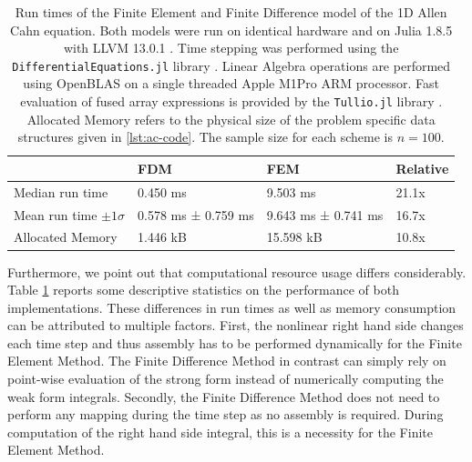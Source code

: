\documentclass[sn-mathphys,Numbered]{sn-jnl}%
\theoremstyle{thmstyleone}%
\theoremstyle{thmstyletwo}%
\theoremstyle{thmstylethree}%
\begin{document}
\begin{table}[htbp!]
\centering
\caption{Run times of the Finite Element and Finite Difference model of the 1D Allen Cahn equation. Both models were run on identical hardware and on Julia 1.8.5 with LLVM 13.0.1 \cite{bezansonJuliaFreshApproach2017}. Time stepping was performed using the \texttt{DifferentialEquations.jl} library \cite{rackauckas2017differentialequations}. Linear Algebra operations are performed using OpenBLAS \cite{wangAUGEMAutomaticallyGenerate2013,xianyiModeldriven} on a single threaded Apple M1Pro ARM processor. Fast evaluation of fused array expressions is provided by the \texttt{Tullio.jl} library \cite{abbottMcabbottTullioJl2022}. Allocated Memory refers to the physical size of the problem specific data structures given in \ref{lst:ac-code}. The sample size for each scheme is $n=100$.}
\label{tab:ac-performance}
\begin{tabular}{llll} 
    \toprule
    & \textbf{FDM} & \textbf{FEM}  & \textbf{Relative}  \\
    \midrule
Median run time             & 0.450 ms           & 9.503 ms             & 21.1x    \\
Mean run time $\pm 1\sigma$ & 0.578 ms ± 0.759 ms & 9.643 ms ±  0.741 ms & 16.7x    \\
Allocated Memory            & 1.446 kB            & 15.598 kB             & 10.8x  \\
\bottomrule
\end{tabular}
\end{table}

Furthermore, we point out that computational resource usage differs considerably. 
Table \ref{tab:ac-performance} reports some descriptive statistics on the performance of both implementations.
These differences in run times as well as memory consumption can be attributed to multiple factors.
First, the nonlinear right hand side changes each time step and thus assembly has to be performed dynamically for the Finite Element Method. The Finite Difference Method in contrast can simply rely on point-wise evaluation of the strong form instead of numerically computing the weak form integrals.
Secondly, the Finite Difference Method does not need to perform any mapping during the time step as no assembly is required. During computation of the right hand side integral, this is a necessity for the Finite Element Method.
\end{document}
